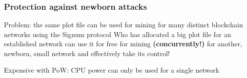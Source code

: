 \documentclass[11pt]{beamer}  %
\begin{document}
\begin{frame}\frametitle{Protection against newborn attacks}

  \begin{redbox}{Problem: the same plot file can be used for mining for many distinct blockchain
      networks using the Signum protocol}
    Who has allocated a big plot file for an established network can use it for free
    for mining \textbf{(concurrently!)} for another, newborn, small network and effectively take its control!
  \end{redbox}

  \medskip

  \begin{center}
    Expensive with PoW: CPU power can only be used for a single network
  \end{center}

  \bigskip


\end{frame}

\addtocounter{framenumber}{-1}
\end{document}
